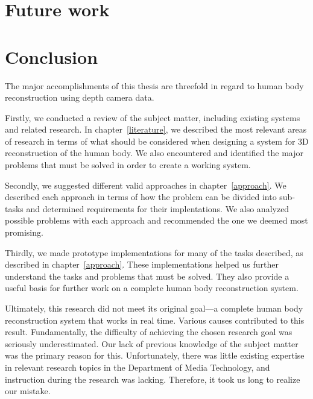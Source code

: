 \section{Future work}


\section{Conclusion}

The major accomplishments of this thesis are threefold in regard to human body reconstruction using depth camera data.

Firstly, we conducted a review of the subject matter, including existing systems and related research. In chapter~\ref{literature}, we described the most relevant areas of research in terms of what should be considered when designing a system for 3D reconstruction of the human body. We also encountered and identified the major problems that must be solved in order to create a working system.

Secondly, we suggested different valid approaches in chapter~\ref{approach}. We described each approach in terms of how the problem can be divided into sub-tasks and determined requirements for their implentations. We also analyzed possible problems with each approach and recommended the one we deemed most promising.

Thirdly, we made prototype implementations for many of the tasks described, as described in chapter~\ref{approach}. These implementations helped us further understand the tasks and problems that must be solved. They also provide a useful basis for further work on a complete human body reconstruction system.

\newtopic

Ultimately, this research did not meet its original goal---a complete human body reconstruction system that works in real time. Various causes contributed to this result. Fundamentally, the difficulty of achieving the chosen research goal was seriously underestimated. Our lack of previous knowledge of the subject matter was the primary reason for this. Unfortunately, there was little existing expertise in relevant research topics in the Department of Media Technology, and instruction during the research was lacking. Therefore, it took us long to realize our mistake.

